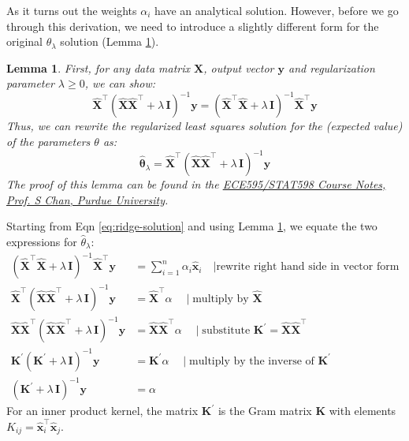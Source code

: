 \documentclass{article}[11pt]
\newtheorem{lemma}{Lemma}
\begin{document}
As it turns out the weights $\alpha_{i}$ have an analytical solution. However, before we go through this derivation,
we need to introduce a slightly different form for the original $\theta_{\lambda}$ solution (Lemma \ref{lemma:ridge-solution}).
\begin{lemma}\label{lemma:ridge-solution}
   First, for any data matrix $\mathbf{X}$, output vector $\mathbf{y}$ and regularization parameter $\lambda\geq{0}$, we can show:
   \begin{equation*}
   \hat{\mathbf{X}}^{\top}\left(\hat{\mathbf{X}}\hat{\mathbf{X}}^{\top}+\lambda\,\mathbf{I}\right)^{-1}\mathbf{y} = \left(\hat{\mathbf{X}}^{\top}\hat{\mathbf{X}}+\lambda\,\mathbf{I}\right)^{-1}\hat{\mathbf{X}}^{\top}\mathbf{y}
   \end{equation*}
   Thus, we can rewrite the regularized least squares solution for the (expected value) of the parameters $\theta$ as:
   \begin{equation*}
   \hat{\mathbf{\theta}}_{\lambda} = \hat{\mathbf{X}}^{\top}\left(\hat{\mathbf{X}}\hat{\mathbf{X}}^{\top}+\lambda\,\mathbf{I}\right)^{-1}\mathbf{y}
   \end{equation*}
   The proof of this lemma can be found in the \href{https://engineering.purdue.edu/ChanGroup/ECE595/files/Lecture03_kernel.pdf}{ECE595/STAT598 Course Notes, Prof. S Chan, Purdue University}.
\end{lemma}
Starting from Eqn \ref{eq:ridge-solution} and using Lemma \ref{lemma:ridge-solution}, we equate the two expressions for $\hat{\theta}_{\lambda}$:
\begin{align*}
\left(\hat{\mathbf{X}}^{\top}\hat{\mathbf{X}}+\lambda\,\mathbf{I}\right)^{-1}\hat{\mathbf{X}}^{\top}\mathbf{y} & = \sum_{i=1}^{n}\alpha_{i}\hat{\mathbf{x}}_{i}\quad{\mid\text{rewrite right hand side in vector form}}\\
\hat{\mathbf{X}}^{\top}\left(\hat{\mathbf{X}}\hat{\mathbf{X}}^{\top}+\lambda\,\mathbf{I}\right)^{-1}\mathbf{y} & = \hat{\mathbf{X}}^{\top}\alpha\quad\mid\text{multiply by $\hat{\mathbf{X}}$} \\
\hat{\mathbf{X}}\hat{\mathbf{X}}^{\top}\left(\hat{\mathbf{X}}\hat{\mathbf{X}}^{\top}+\lambda\,\mathbf{I}\right)^{-1}\mathbf{y} & = \hat{\mathbf{X}}\hat{\mathbf{X}}^{\top}\alpha\quad\mid\text{substitute $\mathbf{K}^{\prime} = \hat{\mathbf{X}}\hat{\mathbf{X}}^{\top}$}\\
\mathbf{K}^{\prime}\left(\mathbf{K}^{\prime}+\lambda\,\mathbf{I}\right)^{-1}\mathbf{y} & = \mathbf{K}^{\prime}\alpha\quad\mid\text{multiply by the inverse of $\mathbf{K}^{\prime}$}\\
\left(\mathbf{K}^{\prime}+\lambda\,\mathbf{I}\right)^{-1}\mathbf{y} & = \alpha
\end{align*}
For an inner product kernel, the matrix $\mathbf{K}^{\prime}$ is the Gram matrix $\mathbf{K}$ with elements $K_{ij} = \hat{\mathbf{x}}_{i}^{\top}\hat{\mathbf{x}}_{j}$.
\end{document}
